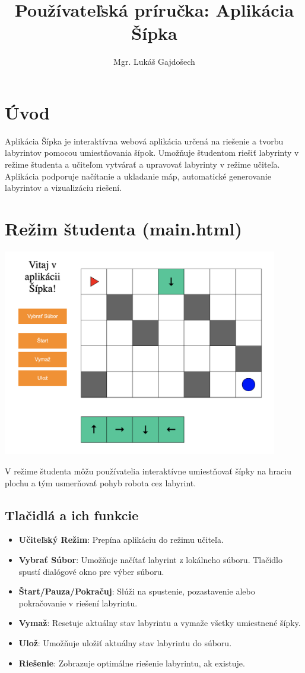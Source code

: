\documentclass{article}
\title{Používateľská príručka: Aplikácia Šípka}
\author{Mgr. Lukáš Gajdošech}
\date{}
\begin{document}
\maketitle

\section*{Úvod}
Aplikácia Šípka je interaktívna webová aplikácia určená na riešenie a tvorbu labyrintov pomocou umiestňovania šípok. Umožňuje študentom riešiť labyrinty v režime študenta a učiteľom vytvárať a upravovať labyrinty v režime učiteľa. Aplikácia podporuje načítanie a ukladanie máp, automatické generovanie labyrintov a vizualizáciu riešení.

\section*{Režim študenta (main.html)}

\begin{center}
    \includegraphics[width=12cm]{student.png}
\end{center}

V režime študenta môžu používatelia interaktívne umiestňovať šípky na hraciu plochu a tým usmerňovať pohyb robota cez labyrint.

\subsection*{Tlačidlá a ich funkcie}
\begin{itemize}
    \item \textbf{Učiteľský Režim}: Prepína aplikáciu do režimu učiteľa.
    \item \textbf{Vybrať Súbor}: Umožňuje načítať labyrint z lokálneho súboru. Tlačidlo spustí dialógové okno pre výber súboru.
    \item \textbf{Štart/Pauza/Pokračuj}: Slúži na spustenie, pozastavenie alebo pokračovanie v riešení labyrintu.
    \item \textbf{Vymaž}: Resetuje aktuálny stav labyrintu a vymaže všetky umiestnené šípky.
    \item \textbf{Ulož}: Umožňuje uložiť aktuálny stav labyrintu do súboru.
    \item \textbf{Riešenie}: Zobrazuje optimálne riešenie labyrintu, ak existuje.
\end{itemize}
\end{document}
